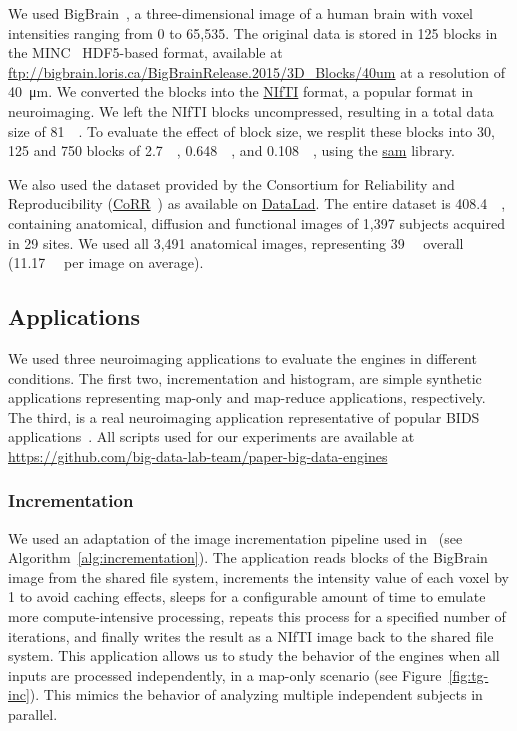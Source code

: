 \documentclass[conference]{IEEEtran}
\begin{document}
We used BigBrain~\cite{Amunts:13}, a three-dimensional image of a human
brain with voxel intensities ranging from 0 to 65,535. The original data is
stored in 125 blocks in the MINC~\cite{minc} HDF5-based format, available
at \url{ftp://bigbrain.loris.ca/BigBrainRelease.2015/3D\_Blocks/40um} at a
resolution of \SI{40}{\micro\metre}. We converted the blocks into the
\href{https://nifti.nimh.nih.gov/nifti-1}{NIfTI} format, a popular format
in neuroimaging. We left the NIfTI blocks uncompressed, resulting in 
a total data size of \SI{81}{\giga\byte}. 
To evaluate the effect of block size, we resplit these blocks into 30, 125 and 750 blocks of 
\SI{2.7}{\giga\byte}, \SI{0.648}{\giga\byte}, and
\SI{0.108}{\giga\byte}, using the \href{https://github.com/big-data-lab-team/sam}{sam} library.

We also used the dataset provided by the Consortium for Reliability and
Reproducibility (\href{http://fcon_1000.projects.nitrc.org/indi/CoRR/html/}{CoRR}~\cite{zuo2014open}) as
available on \href{http://datasets.datalad.org/?dir=/corr/RawDataBIDS}{DataLad}. The
entire dataset is \SI{408.4}{\giga\byte}, containing anatomical, diffusion and
functional images of 1,397 subjects acquired in 29 sites. We used all 3,491 anatomical
images, representing \SI{39}{\giga\byte} overall (\SI{11.17}{\mega\byte} per image on
average).


\subsection{Applications}

We used three neuroimaging applications to evaluate the engines in different
conditions. The first two, incrementation and histogram, are simple 
synthetic applications representing map-only and map-reduce applications,
respectively. The third, is a real neuroimaging application representative
of popular BIDS applications~\cite{gorgolewski2017bids}. All scripts used for our
experiments are available at
\url{https://github.com/big-data-lab-team/paper-big-data-engines}

\subsubsection{Incrementation}
We used an adaptation of the image incrementation pipeline used
in~\cite{hayot2019performance} (see Algorithm~\ref{alg:incrementation}).
The application reads blocks of the BigBrain image from the shared file
system, increments the intensity value of each voxel by 1 to avoid caching
effects, sleeps for a configurable amount of time to emulate more
compute-intensive processing, repeats this process for a specified number of
iterations, and
finally writes the result as a NIfTI image back to the shared file system.
This application allows us to study the behavior of the engines when all
inputs are processed independently, in a map-only scenario (see
Figure~\ref{fig:tg-inc}). This mimics the behavior of analyzing multiple
independent subjects in parallel.
\end{document}
